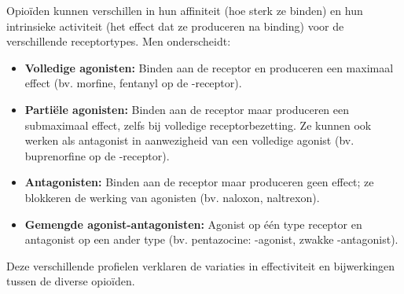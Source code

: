 \documentclass[11pt, a4paper]{report} %
\begin{document}
Opioïden kunnen verschillen in hun affiniteit (hoe sterk ze binden) en hun intrinsieke activiteit (het effect dat ze produceren na binding) voor de verschillende receptortypes. Men onderscheidt:
\begin{itemize}
    \item \textbf{Volledige agonisten:} Binden aan de receptor en produceren een maximaal effect (bv. morfine, fentanyl op de \textmu-receptor).
    \item \textbf{Partiële agonisten:} Binden aan de receptor maar produceren een submaximaal effect, zelfs bij volledige receptorbezetting. Ze kunnen ook werken als antagonist in aanwezigheid van een volledige agonist (bv. buprenorfine op de \textmu-receptor).
    \item \textbf{Antagonisten:} Binden aan de receptor maar produceren geen effect; ze blokkeren de werking van agonisten (bv. naloxon, naltrexon).
    \item \textbf{Gemengde agonist-antagonisten:} Agonist op één type receptor en antagonist op een ander type (bv. pentazocine: \textkappa-agonist, zwakke \textmu-antagonist).
\end{itemize}
Deze verschillende profielen verklaren de variaties in effectiviteit en bijwerkingen tussen de diverse opioïden.
\end{document}
